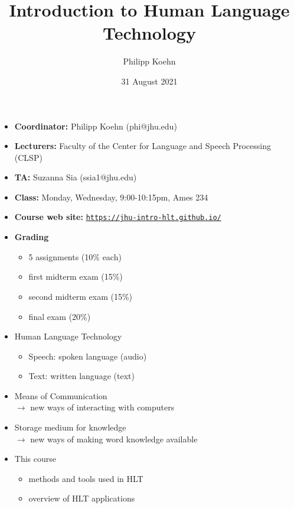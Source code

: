 \documentclass[landscape]{jhuslides3C}
\begin{document}
\rm
\title[Introduction to Human Language Technology: Introduction]{Introduction to Human Language Technology}
\author[Philipp Koehn]{Philipp Koehn}
\date{31 August 2021}
\maketitle


\vfill
\begin{itemize} \itemsep 0mm
\item \textbf{Coordinator:} Philipp Koehn (phi@jhu.edu)
\item \textbf{Lecturers:} Faculty of the Center for Language and Speech Processing (CLSP)
\item \textbf{TA:} Suzanna Sia (ssia1@jhu.edu)
\item \textbf{Class:} Monday, Wednesday, 9:00-10:15pm, Ames 234
\item \textbf{Course web site:} \href{https://jhu-intro-hlt.github.io/}{\tt https://jhu-intro-hlt.github.io/}
\item \textbf{Grading} \vspace{-3mm}
\begin{itemize}
\item 5 assignments (10\% each)
\item first midterm exam (15\%)
\item second midterm exam (15\%)
\item final exam (20\%)
\end{itemize}
\end{itemize}
\vfill


\vfill
\begin{itemize}
\item Human Language Technology
\begin{itemize}
\item Speech: spoken language (audio)
\item Text: written language (text)
\end{itemize}
\item Means of Communication\\
$\rightarrow$ new ways of interacting with computers
\item Storage medium for knowledge\\
$\rightarrow$ new ways of making word knowledge available
\item This course
\begin{itemize}
\item methods and tools used in HLT
\item overview of HLT applications
\end{itemize}
\end{itemize}
\vfill
\end{document}
